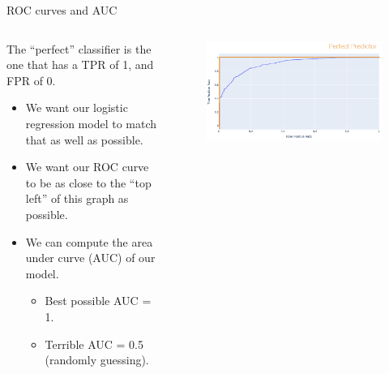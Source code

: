 \documentclass[aspectratio=169]{../latex_main/tntbeamer}  %
\begin{document}
	
	
	\begin{frame}{ROC curves and AUC}
	    \begin{columns}
	        \begin{column}{.5\textwidth}
    	      The “perfect” classifier is the one that has a TPR of 1, and FPR of 0.
	             \begin{itemize}
	                 \item We want our logistic regression model to match that as well as possible.
	                 \item We want our ROC curve to be as close to the “top left” of this graph as possible.
	                 \item We can compute the area under curve (AUC) of our model.
	             
	             \begin{itemize}
	                 \item Best possible AUC = 1.
	                 \item Terrible AUC = 0.5 (randomly guessing).
	             \end{itemize}
	             \end{itemize}
	        \end{column}
	        
	        
	        \begin{column}{.5\textwidth}
	                \begin{figure}
	                    \centering
	                    \includegraphics[scale=.35]{Bild29}
	                \end{figure}
	                
	                
	        \end{column}
	        
	    \end{columns}
	\end{frame}
	
\end{document}

